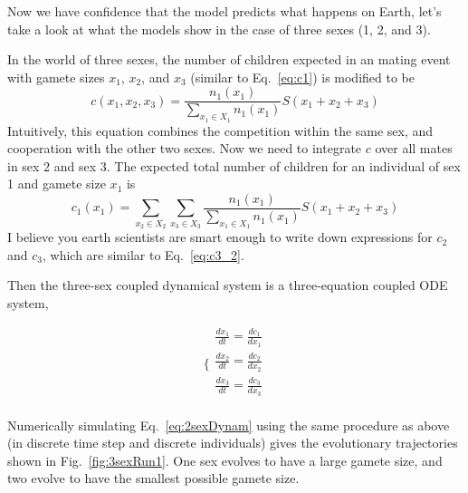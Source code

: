 Now we have confidence that the model predicts what happens on Earth, let's take a look at what the models show in the case of three sexes (1, 2, and 3). 

In the world of three sexes, the number of children expected in an mating event with gamete sizes $x_1$, $x_2$, and $x_3$ (similar to Eq.~\ref{eq:c1}) is modified to be
\begin{equation}\label{eq:c3_1}
    c(x_1, x_2, x_3) = \frac{n_1(x_1)}{\sum_{x_1\in X_1} n_1(x_1)} S(x_1+ x_2 + x_3)
\end{equation}
Intuitively, this equation combines the competition within the same sex, and cooperation with the other two sexes. Now we need to integrate $c$ over all mates in sex 2 and sex 3. The expected total number of children for an individual of sex 1 and gamete size $x_1$ is
\begin{equation} \label{eq:c3_2}
    c_1(x_1) = \sum_{x_2 \in X_2} \sum_{x_3 \in X_3}
   \frac{n_1(x_1)}{\sum_{x_1\in X_1} n_1(x_1)} S(x_1+ x_2 + x_3) 
\end{equation}
I believe you earth scientists are smart enough to write down expressions for $c_2$ and $c_3$, which are similar to Eq.~\ref{eq:c3_2}. 

Then the three-sex coupled dynamical system is a three-equation coupled ODE system, 



\begin{equation} \label{eq:3sexDynam}
\Bigg\{
\begin{array}{ll}
\frac{dx_1}{dt} = \frac{dc_1}{dx_1} \\
\frac{dx_2}{dt} = \frac{dc_2}{dx_2}  \\
\frac{dx_3}{dt} = \frac{dc_3}{dx_3} \\
\end{array}
\end{equation}

Numerically simulating Eq.~\ref{eq:2sexDynam} using the same procedure as above (in discrete time step and discrete individuals) gives the evolutionary trajectories shown in Fig.~\ref{fig:3sexRun1}. One sex evolves to have a large gamete size, and two evolve to have the smallest possible gamete size.
